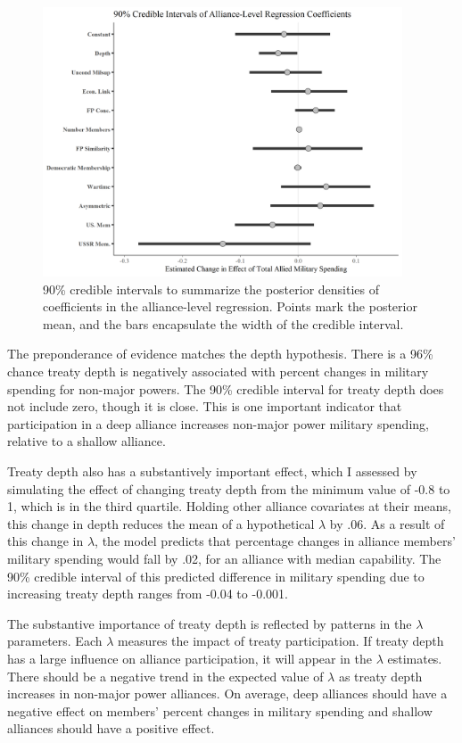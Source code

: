 \documentclass[12pt]{article}
\begin{document}
\begin{figure}[htbp]
	\centering
		\includegraphics[width=0.95\textwidth]{../figures/alliance-reg-nonmaj.png}
	\caption{90\% credible intervals to summarize the posterior densities of coefficients in the alliance-level regression. Points mark the posterior mean, and the bars encapsulate the width of the credible interval.}
	\label{fig:alliance-reg-nonmaj}
\end{figure}


The preponderance of evidence matches the depth hypothesis. 
There is a 96\% chance treaty depth is negatively associated with percent changes in military spending for non-major powers.
The 90\% credible interval for treaty depth does not include zero, though it is close. 
This is one important indicator that participation in a deep alliance increases non-major power military spending, relative to a shallow alliance. 


Treaty depth also has a substantively important effect, which I assessed by simulating the effect of changing treaty depth from the minimum value of -0.8 to 1, which is in the third quartile. 
Holding other alliance covariates at their means, this change in depth reduces the mean of a hypothetical $\lambda$ by .06.
As a result of this change in $\lambda$, the model predicts that percentage changes in alliance members' military spending would fall by .02, for an alliance with median capability. 
The 90\% credible interval of this predicted difference in military spending due to increasing treaty depth ranges from -0.04 to -0.001. 


The substantive importance of treaty depth is reflected by patterns in the $\lambda$ parameters. 
Each $\lambda$ measures the impact of treaty participation. 
If treaty depth has a large influence on alliance participation, it will appear in the $\lambda$ estimates. 
There should be a negative trend in the expected value of $\lambda$ as treaty depth increases in non-major power alliances.
On average, deep alliances should have a negative effect on members' percent changes in military spending and shallow alliances should have a positive effect.  
\end{document}
